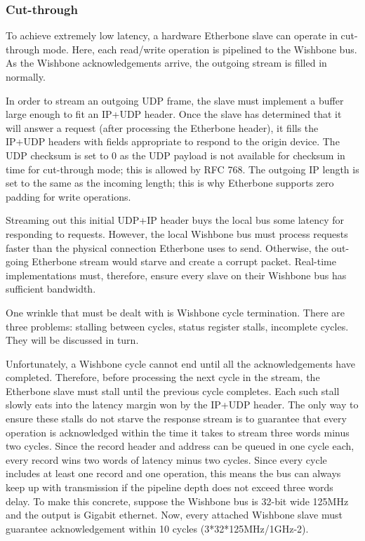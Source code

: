 \documentclass{article}
\begin{document}
\subsubsection{Cut-through}
\label{sec:cut}

To achieve extremely low latency,
a hardware Etherbone slave can operate in cut-through mode.
Here, 
each read/write operation is pipelined to the Wishbone bus.
As the Wishbone acknowledgements arrive,
the outgoing stream is filled in normally.

In order to stream an outgoing UDP frame,
the slave must implement a buffer large enough to fit an IP+UDP header.
Once the slave has determined that it will answer a request
(after processing the Etherbone header),
it fills the IP+UDP headers with fields appropriate 
to respond to the origin device.
The UDP checksum is set to 0 as the UDP payload is not available for
checksum in time for cut-through mode;
this is allowed by RFC 768.
The outgoing IP length is set to the same as the incoming length;
this is why Etherbone supports zero padding for write operations.

Streaming out this initial UDP+IP header buys the local bus some 
latency for responding to requests.
However, the local Wishbone bus must process requests faster than the
physical connection Etherbone uses to send.
Otherwise, the out-going Etherbone stream would starve and create a 
corrupt packet.
Real-time implementations must, therefore, 
ensure every slave on their Wishbone bus has sufficient bandwidth.

One wrinkle that must be dealt with is Wishbone cycle termination.
There are three problems: 
stalling between cycles, 
status register stalls,
incomplete cycles.
They will be discussed in turn.

Unfortunately, a Wishbone cycle cannot end until all the acknowledgements
have completed.
Therefore,
before processing the next cycle in the stream,
the Etherbone slave must stall until the previous cycle completes.
Each such stall slowly eats into the latency margin 
won by the IP+UDP header.
The only way to ensure these stalls do not starve the response stream
is to guarantee that every operation is acknowledged within the time
it takes to stream three words minus two cycles.
Since the record header and address can be queued in one cycle each,
every record wins two words of latency minus two cycles.
Since every cycle includes at least one record and one operation,
this means the bus can always keep up with transmission if
the pipeline depth does not exceed three words delay.
To make this concrete,
suppose the Wishbone bus is 32-bit wide 125MHz and 
the output is Gigabit ethernet.
Now, every attached Wishbone slave must 
guarantee acknowledgement within 10 cycles
(3*32*125MHz/1GHz-2).
\end{document}
